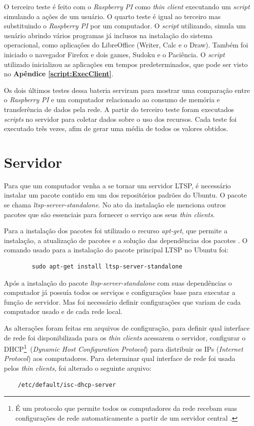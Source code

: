 \documentclass[
	12pt,				%
	openright,			%
	twoside,			%
	a4paper,			%
	chapter=TITLE,		%
	english,			%
	brazil				%
	]{abntex2}
\begin{document}
O terceiro teste é feito com o \textit{Raspberry PI} como \textit{thin client} executando um \textit{script} simulando a ações de um usuário. O quarto teste é igual ao terceiro mas substituindo o  \textit{Raspberry PI} por um computador. O \textit{script} utilizando, simula um usuário abrindo vários programas já inclusos na instalação do sistema operacional, como aplicações do LibreOffice (Writer, Calc e o Draw). Também foi iniciado o navegador Firefox e dois games, Sudoku e o Paciência. O \textit{script} utilizado inicializou as aplicações em tempos predeterminados, que pode ser visto no \textbf{Apêndice \ref{script:ExecClient}}.

Os dois últimos testes dessa bateria serviram para mostrar uma comparação entre o \textit{Raspberry PI} e um computador relacionado ao consumo de memória e transferência de dados pela rede. A partir do terceiro teste foram executados \textit{scripts} no servidor para coletar dados sobre o uso dos recursos. Cada teste foi executado três vezes, afim de gerar uma média de todos os valores obtidos. 


\section{Servidor}
\label{confServ}
Para que um computador venha a se tornar um servidor LTSP, é necessário instalar um pacote contido em um dos repositórios padrões do Ubuntu. O pacote se chama  \textit{ltsp-server-standalone}. No ato da instalação ele menciona outros pacotes que são  essenciais para fornecer o serviço aos seus \textit{thin clients}.

Para a instalação dos pacotes foi utilizado o recurso \textit{apt-get}, que permite a instalação, a atualização de pacotes e a solução das dependências dos pacotes \cite{apt_get}. O comando usado para a instalação do pacote principal LTSP no Ubuntu foi:
\begin{verbatim}
		sudo apt-get install ltsp-server-standalone
\end{verbatim}

Após a instalação do pacote \textit{ltsp-server-standalone} com suas dependências o computador já possuía todos os serviços e configurações base para executar a função de servidor. Mas foi necessário definir configurações que variam de cada computador usado e de cada rede local. 

As alterações foram feitas em arquivos de configuração, para definir qual interface de rede foi disponibilizada para os \textit{thin clients} acessarem o servidor,  configurar o DHCP\footnote{É um protocolo que permite todos os computadores da rede recebam suas configurações de rede automaticamente a partir de um servidor central \cite{dhcp}.}\ (\textit{Dynamic Host Configuration Protocol}) para distribuir os IPs (\textit{Internet Protocol}) aos computadores. Para determinar qual interface de rede foi usada pelos \textit{thin clients}, foi alterado o seguinte arquivo:
\begin{verbatim}
	/etc/default/isc-dhcp-server
\end{verbatim}  
\end{document}

